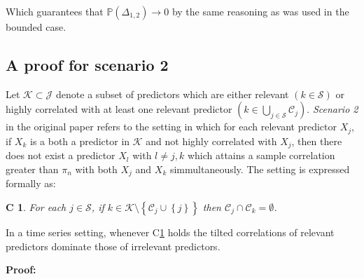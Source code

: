 \documentclass[11pt]{report}\usepackage[utf8]{inputenc}
\newtheorem{condition}{C}
\newtheorem{theorem}{Theorem}
\begin{document}
Which guarantees that $\mathbb{P}\left ( \Delta_{1,2} \right ) \rightarrow 0$ by the same reasoning as was used in the bounded case. 

\subsection{A proof for scenario 2} \label{scenario2}

Let $\mathcal{K} \subset \mathcal{J}$ denote a subset of predictors which are either relevant $\left ( k \in \mathcal{S} \right )$ or highly correlated with at least one relevant predictor $\left ( k \in \bigcup_{j \in \mathcal{S}}\mathcal{C}_j  \right )$. \textit{Scenario 2} in the original paper refers to the setting in which for each relevant predictor $X_j$, if $X_k$ is a both a predictor in $\mathcal{K}$ and not highly correlated with $X_j$, then there does not exist a predictor $X_l$ with $l \neq j,k$ which attains a sample correlation greater than $\pi_n$ with both $X_j$ and $X_k$ simmultaneously. The setting is expressed formally as: 

\begin{condition} \label{C2}
    For each $j \in \mathcal{S}$, if $k \in \mathcal{K} \setminus \left \{ \mathcal{C}_j \cup \left \{ j \right \} \right \}$ then $\mathcal{C}_j \cap \mathcal{C}_k = \emptyset$. 
\end{condition}

In a time series setting, whenever C\ref{C2} holds the tilted correlations of relevant predictors dominate those of irrelevant predictors.

\bigskip


\bigskip
\bigskip

\textbf{Proof:}
\end{document}
